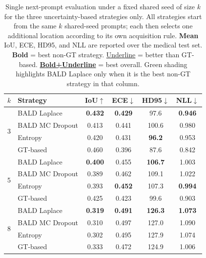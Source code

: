 \begin{table}[t]
\centering
\caption{Single next-prompt evaluation under a fixed shared seed of size $k$ for the three uncertainty-based strategies only. All strategies start from the same $k$ shared-seed prompts; each then selects one additional location according to its own acquisition rule. \textbf{Mean} IoU, ECE, HD95, and NLL are reported over the medical test set. \textbf{Bold} = best non-GT strategy. \underline{Underline} = better than GT-based. \textbf{\underline{Bold+Underline}} = best overall. Green shading highlights BALD Laplace only when it is the best non-GT strategy in that column.}
\label{tab:shared_seed_next_prompt_trio}
\setlength{\tabcolsep}{5pt}
\begin{tabular}{llcccc}
\toprule
$k$ & Strategy & IoU$\uparrow$ & ECE$\downarrow$ & HD95$\downarrow$ & NLL$\downarrow$ \\
\midrule
\multirow{4}{*}{3}
  & BALD Laplace    & {\cellcolor{green!8}\bfseries 0.432} & {\cellcolor{green!8}\bfseries 0.429} & 97.6 & {\cellcolor{green!8}\bfseries 0.946} \\
  & BALD MC Dropout & 0.413                            & 0.441                            & 100.6 & 0.980 \\
  & Entropy         & 0.420                            & 0.431                            & {\bfseries 96.2} & 0.953 \\
\midrule
  & GT-based        & 0.460                            & 0.396                            & 87.6 & 0.842 \\
\midrule
\multirow{4}{*}{5}
  & BALD Laplace    & {\cellcolor{green!8}\bfseries 0.400} & 0.455                            & {\cellcolor{green!8}\bfseries 106.7} & 1.003 \\
  & BALD MC Dropout & 0.389                            & 0.462                            & 109.1 & 1.022 \\
  & Entropy         & 0.393                            & {\bfseries 0.452}                & 107.3 & {\bfseries 0.994} \\
\midrule
  & GT-based        & 0.425                            & 0.423                            & 99.6 & 0.903 \\
\midrule
\multirow{4}{*}{8}
  & BALD Laplace    & {\cellcolor{green!8}\bfseries 0.319} & {\cellcolor{green!8}\bfseries 0.491} & {\cellcolor{green!8}\bfseries 126.3} & {\cellcolor{green!8}\bfseries 1.073} \\
  & BALD MC Dropout & 0.310                            & 0.497                            & 127.0 & 1.090 \\
  & Entropy         & 0.302                            & 0.495                            & 127.9 & 1.074 \\
\midrule
  & GT-based        & 0.333                            & 0.472                            & 124.9 & 1.006 \\
\bottomrule
\end{tabular}
\end{table}



